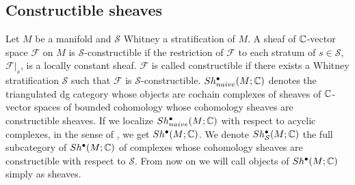 \subsection*{Constructible sheaves}
Let $M$ be a manifold and $\mathcal{S}$ Whitney a stratification of $M$. A sheaf of $\mathbb{C}$-vector space $\mathscr{F}$ on $M$ is $\mathcal{S}$-constructible if the restriction of $\mathscr{F}$ to each stratum of $s\in \mathcal{S}$, $\mathscr{F}|_s$, is a locally constant sheaf. $\mathscr{F}$ is called constructible if there exists a Whitney stratification $\mathcal{S}$ such that $\mathscr{F}$ is $\mathcal{S}$-constructible.
$Sh^\bullet_{naive}(M;\mathbb{C})$ denotes the triangulated dg category whose objects are cochain complexes of sheaves of $\mathbb{C}$-vector spaces of bounded cohomology whose cohomology sheaves are constructible sheaves. If we localize $Sh^\bullet_{naive}(M;\mathbb{C})$ with respect to acyclic complexes, in the sense of \cite{drinfeld2004dg}, we get $Sh^\bullet(M;\mathbb{C})$. We denote $Sh^\bullet_{\mathcal{S}}(M;\mathbb{C})$ the full subcategory of $Sh^\bullet (M;\mathbb{C})$ of complexes whose cohomology sheaves are constructible with respect to $\mathcal{S}$. From now on we will call objects of $Sh^\bullet(M;\mathbb{C})$ simply as sheaves.\\

